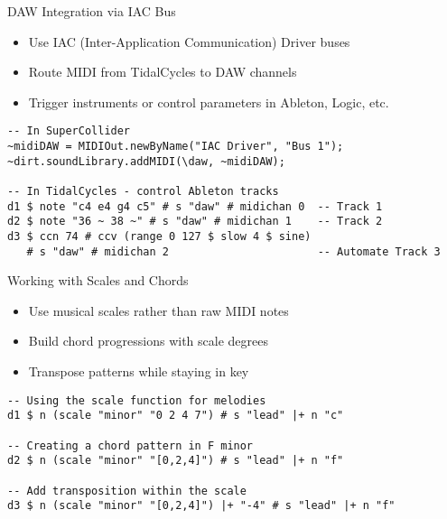 \documentclass{beamer}
\begin{document}
\begin{frame}[fragile]{DAW Integration via IAC Bus}
\begin{itemize}
    \item Use IAC (Inter-Application Communication) Driver buses
    \item Route MIDI from TidalCycles to DAW channels
    \item Trigger instruments or control parameters in Ableton, Logic, etc.
\end{itemize}

\begin{lstlisting}[style=tidal]
-- In SuperCollider
~midiDAW = MIDIOut.newByName("IAC Driver", "Bus 1");
~dirt.soundLibrary.addMIDI(\daw, ~midiDAW);

-- In TidalCycles - control Ableton tracks
d1 $ note "c4 e4 g4 c5" # s "daw" # midichan 0  -- Track 1
d2 $ note "36 ~ 38 ~" # s "daw" # midichan 1    -- Track 2
d3 $ ccn 74 # ccv (range 0 127 $ slow 4 $ sine) 
   # s "daw" # midichan 2                       -- Automate Track 3
\end{lstlisting}
\end{frame}



\begin{frame}[fragile]{Working with Scales and Chords}
\begin{itemize}
    \item Use musical scales rather than raw MIDI notes
    \item Build chord progressions with scale degrees
    \item Transpose patterns while staying in key
\end{itemize}

\begin{lstlisting}[style=tidal]
-- Using the scale function for melodies
d1 $ n (scale "minor" "0 2 4 7") # s "lead" |+ n "c"

-- Creating a chord pattern in F minor
d2 $ n (scale "minor" "[0,2,4]") # s "lead" |+ n "f"

-- Add transposition within the scale
d3 $ n (scale "minor" "[0,2,4]") |+ "-4" # s "lead" |+ n "f"
\end{lstlisting}
\end{frame}
\end{document}
